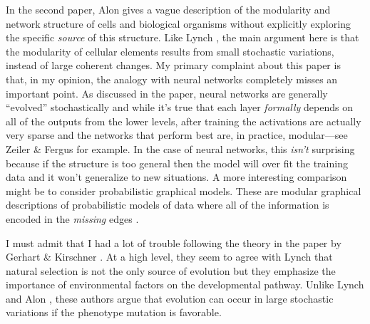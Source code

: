 \documentclass[11pt]{article}
\begin{document}
In the second paper, Alon \cite{alon} gives a vague description of the
modularity and network structure of cells and biological organisms without
explicitly exploring the specific \emph{source} of this structure.
Like Lynch \cite{lynch}, the main argument here is that the modularity of
cellular elements results from small stochastic variations, instead of large
coherent changes.
My primary complaint about this paper is that, in my opinion, the analogy
with neural networks completely misses an important point.
As discussed in the paper, neural networks are generally ``evolved''
stochastically and while it's true that each layer \emph{formally} depends on
all of the outputs from the lower levels, after training the activations are
actually very sparse and the networks that perform best are, in practice,
modular---see Zeiler \& Fergus \cite{fergus} for example.
In the case of neural networks, this \emph{isn't} surprising because if the
structure is too general then the model will over fit the training data and it
won't generalize to new situations.
A more interesting comparison might be to consider probabilistic graphical
models.
These are modular graphical descriptions of probabilistic models of data where
all of the information is encoded in the \emph{missing} edges \cite{pgm}.

I must admit that I had a lot of trouble following the theory in the paper by
Gerhart \& Kirschner \cite{gerhart}.
At a high level, they seem to agree with Lynch \cite{lynch} that natural
selection is not the only source of evolution but they emphasize the
importance of environmental factors on the developmental pathway.
Unlike Lynch \cite{lynch} and Alon \cite{alon}, these authors argue that
evolution can occur in large stochastic variations if the phenotype mutation
is favorable.



{}

\end{document}
